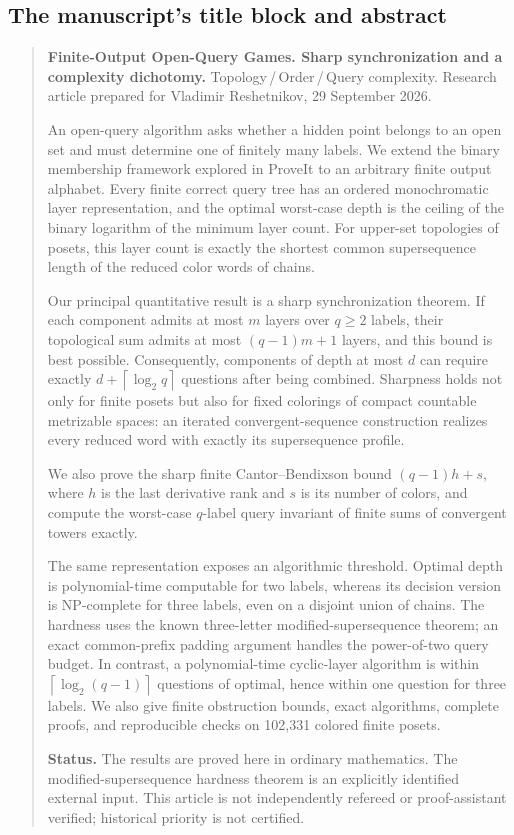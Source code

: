 \documentclass[11pt,letterpaper]{article}
\numberwithin{equation}{section}
\theoremstyle{definition}
\theoremstyle{remark}
\theoremstyle{definition}
\newcommand{\ceil}[1]{\left\lceil#1\right\rceil}
\begin{document}
\subsection{The manuscript's title block and abstract}
\label{fo:sec:abstract}
\begin{quote}\small
\textbf{Finite-Output Open-Query Games. Sharp synchronization and a complexity
dichotomy.} Topology\,/\,Order\,/\,Query complexity. Research article prepared
for Vladimir Reshetnikov, 29 September 2026.

An open-query algorithm asks whether a hidden point belongs to an open set and
must determine one of finitely many labels. We extend the binary membership
framework explored in ProveIt to an arbitrary finite output alphabet. Every
finite correct query tree has an ordered monochromatic layer representation,
and the optimal worst-case depth is the ceiling of the binary logarithm of the
minimum layer count. For upper-set topologies of posets, this layer count is
exactly the shortest common supersequence length of the reduced color words of
chains.

Our principal quantitative result is a sharp synchronization theorem. If each
component admits at most $m$ layers over $q\ge2$ labels, their topological sum
admits at most $(q-1)m+1$ layers, and this bound is best possible. Consequently,
components of depth at most $d$ can require exactly
$d+\ceil{\log_2 q}$ questions after being combined. Sharpness holds not only for
finite posets but also for fixed colorings of compact countable metrizable
spaces: an iterated convergent-sequence construction realizes every reduced
word with exactly its supersequence profile.

We also prove the sharp finite Cantor--Bendixson bound $(q-1)h+s$, where
$h$ is the last derivative rank and $s$ is its number of colors, and compute the
worst-case $q$-label query invariant of finite sums of convergent towers exactly.

The same representation exposes an algorithmic threshold. Optimal depth is
polynomial-time computable for two labels, whereas its decision version is
NP-complete for three labels, even on a disjoint union of chains. The hardness
uses the known three-letter modified-supersequence theorem; an exact
common-prefix padding argument handles the power-of-two query budget. In
contrast, a polynomial-time cyclic-layer algorithm is within
$\ceil{\log_2(q-1)}$ questions of optimal, hence within one question for three
labels. We also give finite obstruction bounds, exact algorithms, complete
proofs, and reproducible checks on 102,331 colored finite posets.

\textbf{Status.} The results are proved here in ordinary mathematics.
The modified-supersequence hardness theorem is an explicitly identified
external input. This article is not independently refereed or proof-assistant
verified; historical priority is not certified.
\end{quote}
\end{document}
